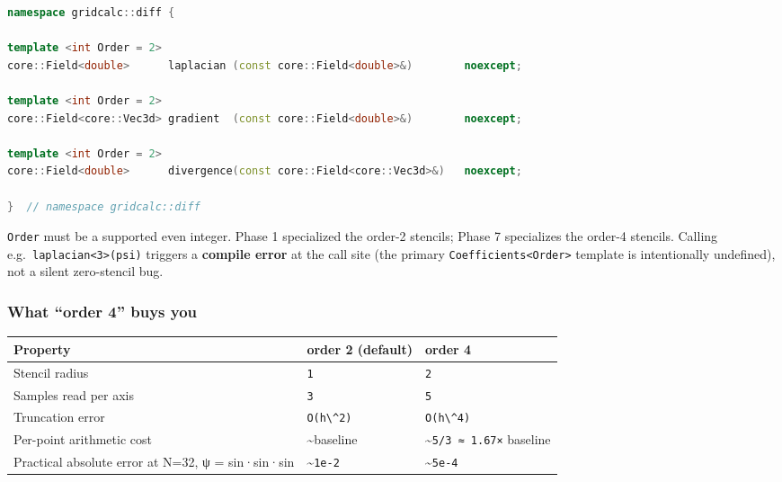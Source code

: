 \begin{lstlisting}[language={C++}]
namespace gridcalc::diff {

template <int Order = 2>
core::Field<double>      laplacian (const core::Field<double>&)        noexcept;

template <int Order = 2>
core::Field<core::Vec3d> gradient  (const core::Field<double>&)        noexcept;

template <int Order = 2>
core::Field<double>      divergence(const core::Field<core::Vec3d>&)   noexcept;

}  // namespace gridcalc::diff
\end{lstlisting}

\passthrough{\lstinline!Order!} must be a supported even integer. Phase
1 specialized the order-2 stencils; Phase 7 specializes the order-4
stencils. Calling e.g.~\passthrough{\lstinline!laplacian<3>(psi)!}
triggers a \textbf{compile error} at the call site (the primary
\passthrough{\lstinline!Coefficients<Order>!} template is intentionally
undefined), not a silent zero-stencil bug.

\subsubsection{What ``order 4'' buys you}\label{what-order-4-buys-you}

{\def\LTcaptype{none} %
\begin{longtable}[]{@{}
  >{\raggedright\arraybackslash}p{}
  >{\raggedright\arraybackslash}p{}
  >{\raggedright\arraybackslash}p{}@{}}
\toprule\noalign{}
\begin{minipage}[b]{\linewidth}\raggedright
Property
\end{minipage} & \begin{minipage}[b]{\linewidth}\raggedright
order 2 (default)
\end{minipage} & \begin{minipage}[b]{\linewidth}\raggedright
order 4
\end{minipage} \\
\midrule\noalign{}
\endhead
\bottomrule\noalign{}
\endlastfoot
Stencil radius & \passthrough{\lstinline!1!} &
\passthrough{\lstinline!2!} \\
Samples read per axis & \passthrough{\lstinline!3!} &
\passthrough{\lstinline!5!} \\
Truncation error & \passthrough{\lstinline!O(h\^2)!} &
\passthrough{\lstinline!O(h\^4)!} \\
Per-point arithmetic cost & \textasciitilde baseline &
\textasciitilde{}\passthrough{\lstinline!5/3 ≈ 1.67×!} baseline \\
Practical absolute error at N=32, ψ = sin·sin·sin &
\textasciitilde{}\passthrough{\lstinline!1e-2!} &
\textasciitilde{}\passthrough{\lstinline!5e-4!} \\
\end{longtable}
}

